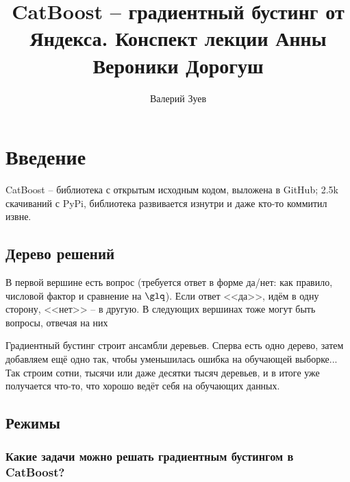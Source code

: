 \documentclass[a4paper,12pt]{article}
\begin{document}
\title{CatBoost -- градиентный бустинг от Яндекса. Конспект лекции Анны Вероники Дорогуш}

\author{Валерий Зуев}

\maketitle

\section{Введение}

CatBoost -- библиотека с открытым исходным кодом, выложена в GitHub; 2.5k скачиваний с PyPi, библиотека развивается изнутри и даже кто-то коммитил извне.

\subsection{Дерево решений}
В первой вершине есть вопрос (требуется ответ в форме да/нет: как правило, числовой фактор и сравнение на $\glq$). Если ответ <<да>>, идём в одну сторону, <<нет>> -- в другую.
В следующих вершинах тоже могут быть вопросы, отвечая на них

Градиентный бустинг строит ансамбли деревьев.
Сперва есть одно дерево, затем добавляем ещё одно так, чтобы уменьшилась ошибка на обучающей выборке...
Так строим сотни, тысячи или даже десятки тысяч деревьев, и в итоге уже получается что-то, что хорошо ведёт себя на обучающих данных.

\subsection{Режимы}

\subsubsection{Какие задачи можно решать градиентным бустингом в CatBoost?}
\end{document}
